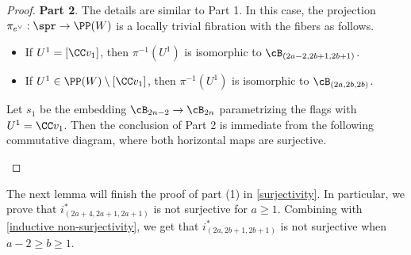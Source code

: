 \documentclass[12pt]{amsart}
\begin{document}
\begin{proof}
    \textbf{Part 2}. The details are similar to Part 1.  In this case, the projection $\pi_{e^\vee}: \spr\rightarrow \PP(W)$ is a locally trivial fibration with the fibers as follows.
   \begin{itemize}
       \item If $U^1=[\CC v_1]$, then $\pi^{-1}(U^1)$ is isomorphic to $\cB_{(2a-2, 2b+1, 2b+1)}$.
       \item If $U^1\in \PP(W)\setminus [\CC v_1]$, then $\pi^{-1}(U^1)$ is isomorphic to $\cB_{(2a, 2b, 2b)}$.
   \end{itemize} 
   Let $s_1$ be the embedding $\cB_{2n-2}\rightarrow \cB_{2n}$ parametrizing the flags with $U^1=\CC v_1$. Then the conclusion of Part 2 is immediate from the following commutative diagram, where both horizontal maps are surjective.
   \begin{center}
            \end{center}
\end{proof}
The next lemma will finish the proof of part (1) in \cref{surjectivity}. In particular, we prove that $i^*_{(2a+4, 2a+1, 2a+1)}$ is not surjective for $a\geqslant 1$. Combining with \cref{inductive non-surjectivity}, we get that $i^*_{(2a, 2b+1, 2b+1)}$ is not surjective when $a -2\geqslant b\geqslant 1$. 
\end{document}
